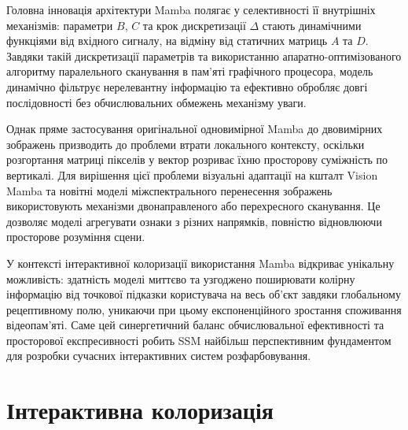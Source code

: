             Головна інновація архітектури Mamba полягає у селективності її внутрішніх механізмів: параметри $B$, $C$ та крок дискретизації $\Delta$ стають динамічними функціями від вхідного сигналу, на відміну від статичних матриць $A$ та $D$.
            Завдяки такій дискретизації параметрів та використанню апаратно-оптимізованого алгоритму паралельного сканування в пам'яті графічного процесора, модель динамічно фільтрує нерелевантну інформацію та ефективно обробляє довгі послідовності без обчислювальних обмежень механізму уваги.

            Однак пряме застосування оригінальної одновимірної Mamba до двовимірних зображень призводить до проблеми втрати локального контексту, оскільки розгортання матриці пікселів у вектор розриває їхню просторову суміжність по вертикалі.
            Для вирішення цієї проблеми візуальні адаптації на кшталт Vision Mamba \cite{2024-vim} та новітні моделі міжспектрального перенесення зображень \cite{2024-colormamba} використовують механізми двонаправленого або перехресного сканування.
            Це дозволяє моделі агрегувати ознаки з різних напрямків, повністю відновлюючи просторове розуміння сцени.

            У контексті інтерактивної колоризації використання Mamba відкриває унікальну можливість: здатність моделі миттєво та узгоджено поширювати колірну інформацію від точкової підказки користувача на весь об'єкт завдяки глобальному рецептивному полю, уникаючи при цьому експоненційного зростання споживання відеопам'яті.
            Саме цей синергетичний баланс обчислювальної ефективності та просторової експресивності робить SSM найбільш перспективним фундаментом для розробки сучасних інтерактивних систем розфарбовування.

    \section{Інтерактивна колоризація}

